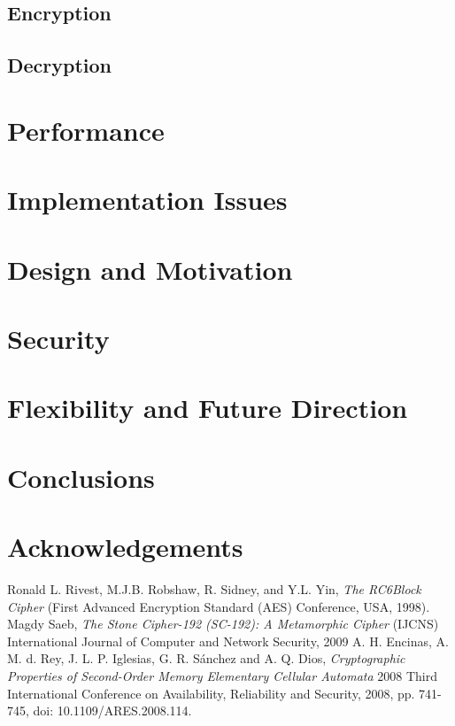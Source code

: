 \documentclass{article}
\begin{document}
\subsection{Encryption}

\subsection{Decryption}

\section{Performance}

\section{Implementation Issues}

\section{Design and Motivation}

\section{Security}

\section{Flexibility and Future Direction}

\section{Conclusions}

\section{Acknowledgements}

\begin{thebibliography}{unsrt}
  Ronald L. Rivest, M.J.B. Robshaw, R. Sidney, and Y.L. Yin, \emph{The RC6\texttrademark Block Cipher} (First Advanced Encryption Standard (AES) Conference, USA, 1998).
  Magdy Saeb, \emph{The Stone Cipher-192 (SC-192): A Metamorphic Cipher} (IJCNS) International Journal of Computer and Network Security, 2009
  A. H. Encinas, A. M. d. Rey, J. L. P. Iglesias, G. R. Sánchez and A. Q. Dios, \emph{Cryptographic Properties of Second-Order Memory Elementary Cellular Automata} 2008 Third International Conference on Availability, Reliability and Security, 2008, pp. 741-745, doi: 10.1109/ARES.2008.114.
\end{thebibliography}
\end{document}
